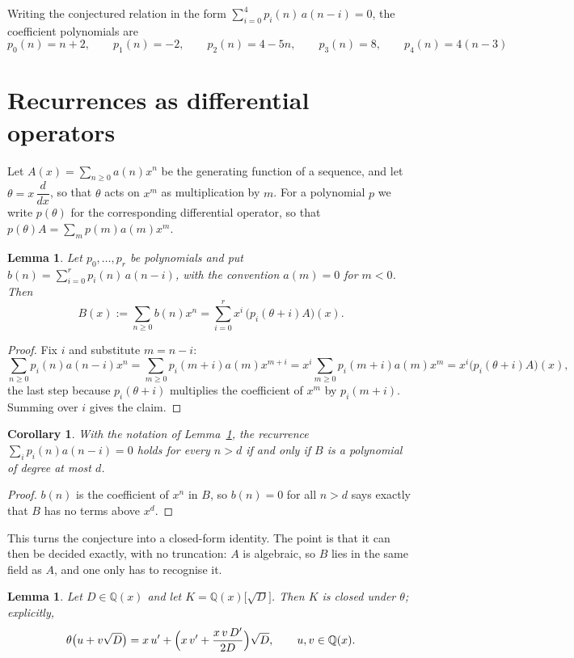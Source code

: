 \documentclass[11pt,a4paper]{article}
\theoremstyle{plain}
\newtheorem{lemma}[theorem]{Lemma}
\newtheorem{corollary}[theorem]{Corollary}
\theoremstyle{definition}
\begin{document}
Writing the conjectured relation in the form $\sum_{i=0}^{4}p_{i}(n)\,a(n-i)=0$,
the coefficient polynomials are
\[
p_{0}(n)=n + 2,\qquad p_{1}(n)=-2,\qquad p_{2}(n)=4 - 5 n,\qquad p_{3}(n)=8,\qquad p_{4}(n)=4 \left(n - 3\right)
\]

\section{Recurrences as differential operators}

Let $A(x)=\sum_{n\ge0}a(n)x^{n}$ be the generating function of a sequence, and let
$\theta=x\,\dfrac{d}{dx}$, so that $\theta$ acts on $x^{m}$ as multiplication by $m$. For a
polynomial $p$ we write $p(\theta)$ for the corresponding differential operator, so that
$p(\theta)A=\sum_{m}p(m)a(m)x^{m}$.

\begin{lemma}\label{lem:transfer}
Let $p_{0},\dots,p_{r}$ be polynomials and put $b(n)=\sum_{i=0}^{r}p_{i}(n)\,a(n-i)$, with
the convention $a(m)=0$ for $m<0$. Then
\[
B(x):=\sum_{n\ge0}b(n)x^{n}=\sum_{i=0}^{r}x^{i}\,\bigl(p_{i}(\theta+i)A\bigr)(x).
\]
\end{lemma}

\begin{proof}
Fix $i$ and substitute $m=n-i$:
\[
\sum_{n\ge0}p_{i}(n)a(n-i)x^{n}=\sum_{m\ge0}p_{i}(m+i)a(m)x^{m+i}
=x^{i}\sum_{m\ge0}p_{i}(m+i)a(m)x^{m}=x^{i}\bigl(p_{i}(\theta+i)A\bigr)(x),
\]
the last step because $p_{i}(\theta+i)$ multiplies the coefficient of $x^{m}$ by
$p_{i}(m+i)$. Summing over $i$ gives the claim.
\end{proof}

\begin{corollary}\label{cor:criterion}
With the notation of Lemma~\ref{lem:transfer}, the recurrence
$\sum_{i}p_{i}(n)a(n-i)=0$ holds for every $n>d$ if and only if $B$ is a polynomial of
degree at most $d$.
\end{corollary}

\begin{proof}
$b(n)$ is the coefficient of $x^{n}$ in $B$, so $b(n)=0$ for all $n>d$ says exactly that
$B$ has no terms above $x^{d}$.
\end{proof}

This turns the conjecture into a closed-form identity. The point is that it can then be
decided exactly, with no truncation: $A$ is algebraic, so $B$ lies in the same field as
$A$, and one only has to recognise it.

\begin{lemma}\label{lem:field}
Let $D\in\mathbb{Q}(x)$ and let $K=\mathbb{Q}(x)\bigl[\sqrt{D}\bigr]$. Then $K$ is closed
under $\theta$; explicitly,
\[
\theta\bigl(u+v\sqrt{D}\bigr)=x\,u'+\Bigl(x\,v'+\frac{x\,v\,D'}{2D}\Bigr)\sqrt{D},
\qquad u,v\in\mathbb{Q}(x).
\]
\end{lemma}
\end{document}
